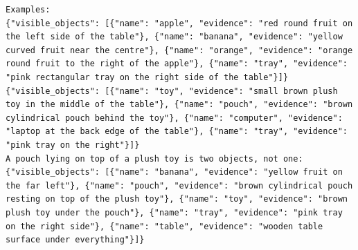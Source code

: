 \begin{lstlisting}[style=prompt]
Examples:
{"visible_objects": [{"name": "apple", "evidence": "red round fruit on the left side of the table"}, {"name": "banana", "evidence": "yellow curved fruit near the centre"}, {"name": "orange", "evidence": "orange round fruit to the right of the apple"}, {"name": "tray", "evidence": "pink rectangular tray on the right side of the table"}]}
{"visible_objects": [{"name": "toy", "evidence": "small brown plush toy in the middle of the table"}, {"name": "pouch", "evidence": "brown cylindrical pouch behind the toy"}, {"name": "computer", "evidence": "laptop at the back edge of the table"}, {"name": "tray", "evidence": "pink tray on the right"}]}
A pouch lying on top of a plush toy is two objects, not one:
{"visible_objects": [{"name": "banana", "evidence": "yellow fruit on the far left"}, {"name": "pouch", "evidence": "brown cylindrical pouch resting on top of the plush toy"}, {"name": "toy", "evidence": "brown plush toy under the pouch"}, {"name": "tray", "evidence": "pink tray on the right side"}, {"name": "table", "evidence": "wooden table surface under everything"}]}
\end{lstlisting}
